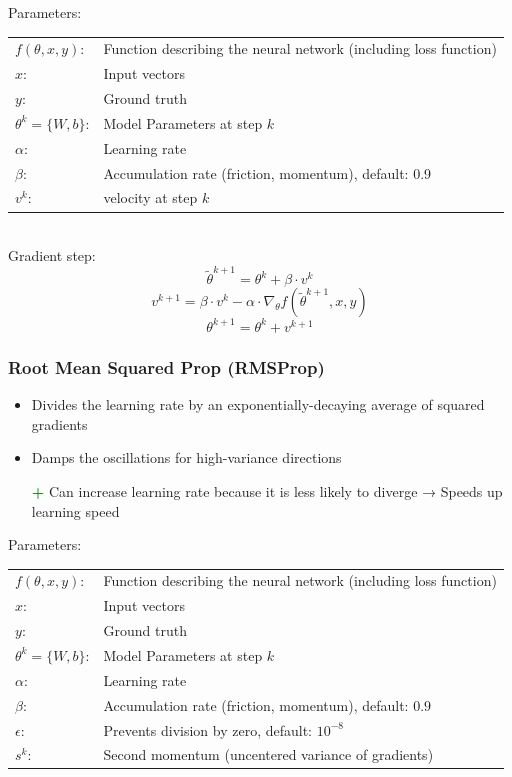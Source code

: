 \documentclass[10pt,a4paper]{article}
\newcommand{\pros}{\textcolor{green}{\textbf{+}}}
\begin{document}
Parameters: \\
\begin{tabular}{ll}
	$f(\theta, x, y)$: & Function describing the neural network (including loss function) \\
	$x$: & Input vectors \\
	$y$: & Ground truth \\
	$\theta^k = \{W, b\}$: & Model Parameters at step $k$\\
	$\alpha$: & Learning rate \\
	$\beta$: & Accumulation rate (friction, momentum), default: 0.9 \\
	$v^k$: & velocity at step $k$ \\
\end{tabular} \\

Gradient step:
$$
	\tilde \theta^{k + 1} = \theta^k + \beta ⋅ v^k
$$
$$
	v^{k + 1} = \beta ⋅ v^k - \alpha ⋅ \nabla_\theta f(\tilde \theta^{k + 1}, x, y)
$$
$$
	\theta^{k + 1} = \theta^k + v^{k + 1}
$$

\subsubsection{Root Mean Squared Prop (RMSProp)}
\begin{itemize}
	\item Divides the learning rate by an exponentially-decaying average of squared gradients
	\item Damps the oscillations for high-variance directions
	\item[\pros] Can increase learning rate because it is less likely to diverge → Speeds up learning speed
\end{itemize}

Parameters: \\
\begin{tabular}{ll}
	$f(\theta, x, y)$: & Function describing the neural network (including loss function) \\
	$x$: & Input vectors \\
	$y$: & Ground truth \\
	$\theta^k = \{W, b\}$: & Model Parameters at step $k$\\
	$\alpha$: & Learning rate \\
	$\beta$: & Accumulation rate (friction, momentum), default: $0.9$ \\
	$\epsilon$: & Prevents division by zero, default: $10^{-8}$ \\
	$s^k$: & Second momentum (uncentered variance of gradients)
\end{tabular} \\
\end{document}
